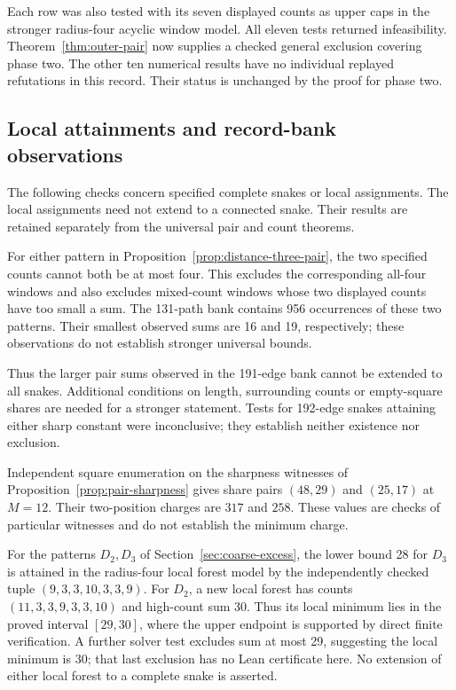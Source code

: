 \documentclass[11pt,a4paper]{article}
\theoremstyle{definition}
\theoremstyle{remark}
\begin{document}
Each row was also tested with its seven displayed counts as upper caps in the stronger radius-four acyclic window model. All eleven tests returned infeasibility. Theorem~\ref{thm:outer-pair} now supplies a checked general exclusion covering phase two. The other ten numerical results have no individual replayed refutations in this record. Their status is unchanged by the proof for phase two.

\subsection{Local attainments and record-bank observations}\label{app:local-observations}
The following checks concern specified complete snakes or local assignments. The local assignments need not extend to a connected snake. Their results are retained separately from the universal pair and count theorems.

For either pattern in Proposition~\ref{prop:distance-three-pair}, the two specified counts cannot both be at most four. This excludes the corresponding all-four windows and also excludes mixed-count windows whose two displayed counts have too small a sum. The 131-path bank contains 956 occurrences of these two patterns. Their smallest observed sums are 16 and 19, respectively; these observations do not establish stronger universal bounds.

Thus the larger pair sums observed in the 191-edge bank cannot be extended to all snakes. Additional conditions on length, surrounding counts or empty-square shares are needed for a stronger statement. Tests for 192-edge snakes attaining either sharp constant were inconclusive; they establish neither existence nor exclusion.

Independent square enumeration on the sharpness witnesses of Proposition~\ref{prop:pair-sharpness} gives share pairs $(48,29)$ and $(25,17)$ at $M=12$. Their two-position charges are $317$ and $258$. These values are checks of particular witnesses and do not establish the minimum charge.

For the patterns $D_2,D_3$ of Section~\ref{sec:coarse-excess}, the lower bound 28 for $D_3$ is attained in the radius-four local forest model by the independently checked tuple $(9,3,3,10,3,3,9)$. For $D_2$, a new local forest has counts $(11,3,3,9,3,3,10)$ and high-count sum 30. Thus its local minimum lies in the proved interval $[29,30]$, where the upper endpoint is supported by direct finite verification. A further solver test excludes sum at most 29, suggesting the local minimum is 30; that last exclusion has no Lean certificate here. No extension of either local forest to a complete snake is asserted.
\end{document}
